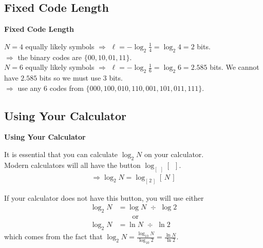 \documentclass[compress]{beamer}        %
\makeatletter
\newcommand{\tcb}{\textcolor{beamer@blendedblue}}
\makeatother
\begin{document}
\subsection{Fixed Code Length}
\begin{frame}{\bf \tcb{Fixed Code Length}}

$N=4$ equally likely symbols $\Rightarrow$ $\ell =  - \log_2 \tfrac{1}{4} = \log_2 4 = 2$ bits.\\[0.6cm]
$\Rightarrow$ the binary codes are $\{00,10,01,11\}$.\\[1.4cm]


$N=6$  equally likely  symbols $\Rightarrow$ $\ell =  - \log_2 \tfrac{1}{6} = \log_2 6 =  2.585$ bits. We cannot have $2.585$ bits so we must use 3 bits.\\[0.6cm]
$\Rightarrow$ use any 6 codes from  $\{000,100,010,110,001,101,011,111\}$.


\end{frame}








\subsection{Using Your Calculator}
\begin{frame}{\bf \tcb{Using Your Calculator}}

It is essential that you can calculate $\log_2 N$ on your calculator.\\[0.4cm]

Modern calculators will all have the button $\boxed{\log_{[\,\,\,]} [\,\,\,]}$.
\begin{align*}
\Rightarrow \boxed{\log_2 N = \log_{[\,2\,]} [\,N\,]}
\end{align*}

If your calculator does not have this button, you will use either
\begin{align*}
\log_2 N &= \boxed{\log N} \,\, \boxed{\div} \,\, \boxed{\log 2}\\[0.2cm]
&\qquad\text{or} \\[0.2cm]
\log_2 N &= \boxed{\ln N} \,\, \boxed{\div} \,\, \boxed{\ln 2}
\end{align*}
which comes from the fact that $\log_2 N = \frac{\log_{10} N}{\log_{10} 2} = \frac{\ln N}{\ln 2}$.


\end{frame}
\end{document}
